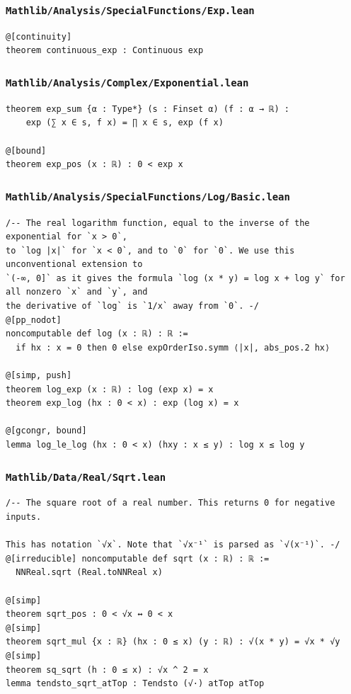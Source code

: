 \subsubsection{\texttt{Mathlib/Analysis/SpecialFunctions/Exp.lean}}
\begin{lstlisting}[language=lean]
@[continuity]
theorem continuous_exp : Continuous exp
\end{lstlisting}

\subsubsection{\texttt{Mathlib/Analysis/Complex/Exponential.lean}}
\begin{lstlisting}[language=lean]
theorem exp_sum {α : Type*} (s : Finset α) (f : α → ℝ) :
    exp (∑ x ∈ s, f x) = ∏ x ∈ s, exp (f x)

@[bound]
theorem exp_pos (x : ℝ) : 0 < exp x
\end{lstlisting}

\subsubsection{\texttt{Mathlib/Analysis/SpecialFunctions/Log/Basic.lean}}
\begin{lstlisting}[language=lean]
/-- The real logarithm function, equal to the inverse of the exponential for `x > 0`,
to `log |x|` for `x < 0`, and to `0` for `0`. We use this unconventional extension to
`(-∞, 0]` as it gives the formula `log (x * y) = log x + log y` for all nonzero `x` and `y`, and
the derivative of `log` is `1/x` away from `0`. -/
@[pp_nodot]
noncomputable def log (x : ℝ) : ℝ :=
  if hx : x = 0 then 0 else expOrderIso.symm ⟨|x|, abs_pos.2 hx⟩

@[simp, push]
theorem log_exp (x : ℝ) : log (exp x) = x
theorem exp_log (hx : 0 < x) : exp (log x) = x

@[gcongr, bound]
lemma log_le_log (hx : 0 < x) (hxy : x ≤ y) : log x ≤ log y
\end{lstlisting}

\newpage
\subsubsection{\texttt{Mathlib/Data/Real/Sqrt.lean}}
\begin{lstlisting}[language=lean]
/-- The square root of a real number. This returns 0 for negative inputs.

This has notation `√x`. Note that `√x⁻¹` is parsed as `√(x⁻¹)`. -/
@[irreducible] noncomputable def sqrt (x : ℝ) : ℝ :=
  NNReal.sqrt (Real.toNNReal x)

@[simp]
theorem sqrt_pos : 0 < √x ↔ 0 < x
@[simp]
theorem sqrt_mul {x : ℝ} (hx : 0 ≤ x) (y : ℝ) : √(x * y) = √x * √y
@[simp]
theorem sq_sqrt (h : 0 ≤ x) : √x ^ 2 = x
lemma tendsto_sqrt_atTop : Tendsto (√·) atTop atTop
\end{lstlisting}

